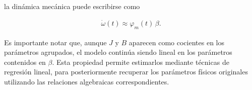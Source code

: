 la dinámica mecánica puede escribirse como

\begin{align*}
    \dot{\omega}(t) \approx \varphi_m(t)\,\beta.
\end{align*}

Es importante notar que, aunque $J$ y $B$ aparecen como cocientes en los 
parámetros agrupados, el modelo continúa siendo lineal en los parámetros 
contenidos en $\beta$. Esta propiedad permite estimarlos mediante técnicas 
de regresión lineal, para posteriormente recuperar los parámetros físicos 
originales utilizando las relaciones algebraicas correspondientes.
    
    
    
    
    
    
    
    
    
    
    
